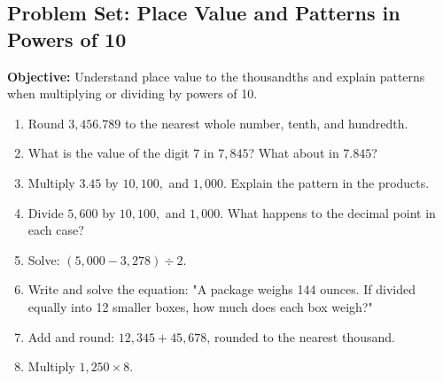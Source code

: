 \documentclass[12pt]{article}
\title{}
\date{}
\begin{document}
\subsection*{Problem Set: Place Value and Patterns in Powers of 10}
\onehalfspacing

\begin{tcolorbox}[colframe=black!40, colback=gray!5, 
coltitle=black, colbacktitle=black!20, fonttitle=\bfseries\Large, 
title=Learning Objective, halign title=center, left=5pt, right=5pt, top=5pt, bottom=15pt]
\textbf{Objective:} Understand place value to the thousandths and explain patterns when multiplying or dividing by powers of 10.
\end{tcolorbox}

\begin{tcolorbox}[colframe=black!60, colback=white, 
coltitle=black, colbacktitle=black!15, fonttitle=\bfseries\Large, 
title=Exercises, halign title=center, left=10pt, right=10pt, top=10pt, bottom=60pt]
\begin{enumerate}[itemsep=4em]
    \item Round \( 3,456.789 \) to the nearest whole number, tenth, and hundredth.
    \item What is the value of the digit \( 7 \) in \( 7,845 \)? What about in \( 7.845 \)?
    \item Multiply \( 3.45 \) by \( 10, 100, \) and \( 1,000 \). Explain the pattern in the products.
    \item Divide \( 5,600 \) by \( 10, 100, \) and \( 1,000 \). What happens to the decimal point in each case?
    \item Solve: \( (5,000 - 3,278) \div 2 \).
    \item Write and solve the equation: "A package weighs 144 ounces. If divided equally into 12 smaller boxes, how much does each box weigh?"
    \item Add and round: \( 12,345 + 45,678 \), rounded to the nearest thousand.
    \item Multiply \( 1,250 \times 8 \).
    \vspace{1cm}
\end{enumerate}
\end{tcolorbox}

\vspace{1em}
\end{document}

